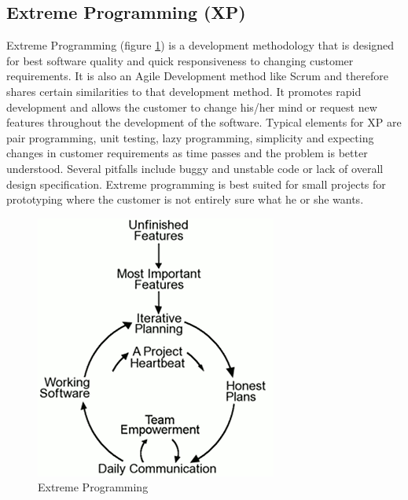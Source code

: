 \subsection{Extreme Programming (XP)}
Extreme Programming (figure \ref{fig:designmodel-xp}) is a development methodology that is designed for
best software quality and quick responsiveness to changing customer requirements. It is also an Agile Development
method like Scrum and therefore shares certain similarities to that development method. It promotes rapid
development and allows the customer to change his/her mind or request new features throughout
the development of the software. Typical elements for XP are pair programming, unit testing,
lazy programming, simplicity and expecting changes in customer requirements as time passes
and the problem is better understood. Several pitfalls include buggy and unstable code or lack of
overall design specification. Extreme programming is best suited for small projects for prototyping
where the customer is not entirely sure what he or she wants.
\begin{figure}[h!]
\centering \includegraphics[scale=0.75]{img/designmodel-xp}
\caption{Extreme Programming\cite{link:xp}\cite{link:wiki-xp}}
\label{fig:designmodel-xp}
\end{figure}

